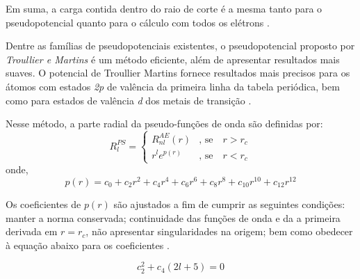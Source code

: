 Em suma, a carga contida dentro do raio de corte é a mesma tanto para o pseudopotencial quanto para o cálculo com todos os elétrons \cite{book_base}.

Dentre as famílias de pseudopotenciais existentes, o pseudopotencial proposto por \textit{Troullier e Martins }\cite{troullier_martins} é um método eficiente, além de apresentar resultados mais suaves. O potencial de Troullier Martins fornece resultados mais precisos para os átomos com estados \textit{2p} de valência da primeira linha da tabela periódica, bem como para estados de valência \textit{d} dos metais de transição \cite{book_base}.

Nesse método, a parte radial da pseudo-funções de onda são definidas por:
\begin{equation}
	R_l^{PS}=\left\{\begin{matrix}
		R_{nl}^{AE}(r) & \text{, se} \quad r>r_c\\ 
		r^{l}e^{p(r)} &\text{, se}\quad r<r_c 
	\end{matrix}\right.
\end{equation}
onde,
\begin{equation}
	p(r)=c_0+c_2r^2+c_4r^4+c_6r^6+c_8r^8+c_{10}r^{10}+c_{12}r^{12}
\end{equation}

Os coeficientes de $ p(r) $ são ajustados a fim de cumprir as seguintes condições: manter a norma conservada; continuidade das funções de onda e da a primeira derivada em $ r=r_c $, não apresentar singularidades na origem; bem como obedecer à equação abaixo para os coeficientes \cite{pseudo_ref}.

\begin{equation}
	c_2^2+c_4(2l+5)=0
\end{equation} 